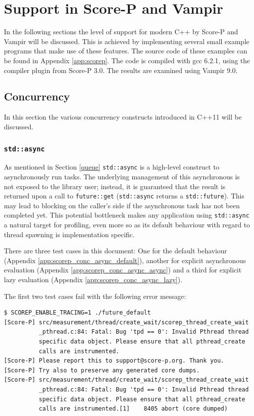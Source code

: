 \section{Support in Score-P and Vampir}

In the following sections the level of support for modern C++ by Score-P and Vampir will be discussed. This is achieved by implementing several small example programs that make use of these features. The source code of these examples can be found in Appendix \ref{app:scorep}. The code is compiled with gcc 6.2.1, using the compiler plugin from Score-P 3.0. The results are examined using Vampir 9.0.

\subsection{Concurrency}\label{scorep:conc}

In this section the various concurrency constructs introduced in C++11 will be discussed.

\subsubsection{\texttt{std::async}}\label{scorep:conc_async}

As mentioned in Section \ref{queue} \texttt{std::async} is a high-level construct to asynchronously run tasks. The underlying management of this asynchronous is not exposed to the library user; instead, it is guaranteed that the result is returned upon a call to \texttt{future::get} (\texttt{std::async} returns a \texttt{std::future}). This may lead to blocking on the caller's side if the asynchronous task has not been completed yet. This potential bottleneck makes any application using \texttt{std::async} a natural target for profiling, even more so as its default behaviour with regard to thread spawning is implementation specific.

There are three test cases in this document: One for the default behaviour (Appendix \ref{app:scorep_conc_async_default}), another for explicit asynchronous evaluation (Appendix \ref{app:scorep_conc_async_async}) and a third for explicit lazy evaluation (Appendix \ref{app:scorep_conc_async_lazy}).

The first two test cases fail with the following error message:

\begin{verbatim}
$ SCOREP_ENABLE_TRACING=1 ./future_default                                      
[Score-P] src/measurement/thread/create_wait/scorep_thread_create_wait
          _pthread.c:84: Fatal: Bug 'tpd == 0': Invalid Pthread thread
          specific data object. Please ensure that all pthread_create
          calls are instrumented.
[Score-P] Please report this to support@score-p.org. Thank you.
[Score-P] Try also to preserve any generated core dumps.
[Score-P] src/measurement/thread/create_wait/scorep_thread_create_wait
          _pthread.c:84: Fatal: Bug 'tpd == 0': Invalid Pthread thread
          specific data object. Please ensure that all pthread_create
          calls are instrumented.[1]    8405 abort (core dumped)
\end{verbatim}

